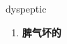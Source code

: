 
\begin{frame}
{\huge dyspeptic}
\begin{center}
\begin{enumerate}\Large
  \item \textbf{脾气坏的}
\end{enumerate}
\end{center}
\end{frame}
